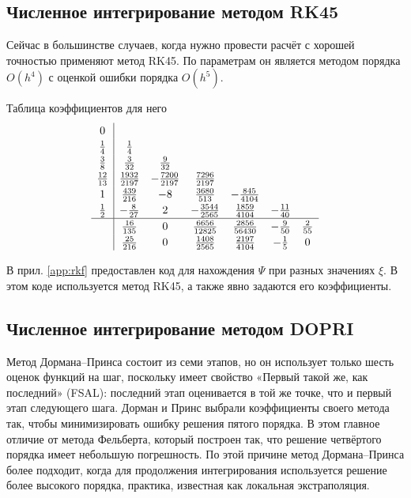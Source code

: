 \documentclass[a4paper,12pt]{article}
\begin{document}
	\subsection{Численное интегрирование методом RK45}

	Сейчас в большинстве случаев, когда нужно провести расчёт с хорошей точностью применяют метод RK45. По параметрам он является методом порядка \(O(h^4)\) с оценкой ошибки порядка  \(O(h^5)\).

	Таблица коэффициентов для него
	 \begin{equation*}
	 \renewcommand\arraystretch{1.2}
	 \begin{array}
	 	{c|ccccccc}
	 	0\\
	 	\frac{1}{4} & \frac{1}{4}\\
	 	\frac{3}{8} &\frac{3}{32} &\frac{9}{32} \\
		\frac{12}{13} &\frac{1932}{2197} &-\frac{7200}{2197} &\frac{7296}{2197} \\
		1 &\frac{439}{216} &-8 &\frac{3680}{513} &-\frac{845}{4104} \\
		\frac{1}{2}&-\frac{8}{27} &2 &-\frac{3544}{2565} &\frac{1859}{4104} &-\frac{11}{40} \\
	 	\hline
	 	& \frac{16}{135} &0 &\frac{6656}{12825} &\frac{2856}{56430} &-\frac{9}{50} &\frac{2}{55}\\
		& \frac{25}{216} &0 &\frac{1408}{2565} &\frac{2197}{4104} &-\frac{1}{5} &0
	 \end{array}
	 \end{equation*}
	 
	 В  прил. \ref{app:rkf} предоставлен код для нахождения \(\Psi\) при разных значениях \(\xi\). В этом коде используется метод RK45, а также явно задаются его коэффициенты.

	\subsection{Численное интегрирование методом DOPRI}

	Метод Дормана--Принса состоит из семи этапов, но он использует только шесть оценок функций на шаг, поскольку имеет свойство «Первый такой же, как последний» (FSAL): последний этап оценивается в той же точке, что и первый этап следующего шага. Дорман и Принс выбрали коэффициенты своего метода так, чтобы минимизировать ошибку решения пятого порядка. В этом главное отличие от метода Фельберта, который построен так, что решение четвёртого порядка имеет небольшую погрешность. По этой причине метод Дормана--Принса более подходит, когда для продолжения интегрирования используется решение более высокого порядка, практика, известная как локальная экстраполяция.
\end{document}
